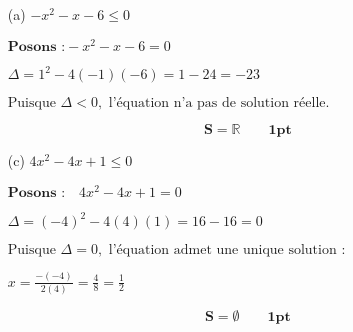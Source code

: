 \documentclass[12pt,a4paper]{article}
\begin{document}
\begin{enumerate}
    \item[(a)] \( -x^2 - x - 6 \leq 0 \) 

\(
\textbf{Posons :} -x^2 - x - 6 = 0 
\)

\(
\Delta = 1^2 - 4(-1)(-6) = 1 - 24 = -23
\)

\(
\text{Puisque } \Delta < 0, \text{ l'équation n'a pas de solution réelle.}
\)

\begin{center}


\end{center}

\begin{tcolorbox}[colback=yellow!20, colframe=black, sharp corners]
    \[
    \mathbf{S = \mathbb{R}}\quad\quad \textbf{1pt}
    \]
\end{tcolorbox}

    \item[(c)] \( 4x^2 - 4x + 1 \leq 0 \) 
    
\(
\textbf{Posons :} \quad 4x^2 - 4x + 1 = 0
\)

\(
\Delta = (-4)^2 - 4(4)(1) = 16 - 16 = 0
\)

\(
\text{Puisque } \Delta = 0, \text{ l'équation admet une unique solution :}
\)

\(
x = \frac{-(-4)}{2(4)} = \frac{4}{8} = \frac{1}{2}
\)

\begin{center}
\end{center}

\begin{tcolorbox}[colback=yellow!20, colframe=black, sharp corners]
    \[
    \mathbf{S = \emptyset}\quad\quad \textbf{1pt}
    \]
\end{tcolorbox}

\end{enumerate}
\end{document}
